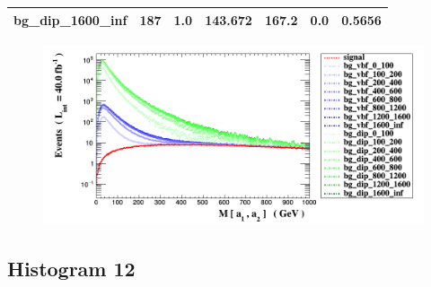 \documentclass[a4paper, 10pt]{article}
\begin{document}
\begin{table}[H]
\begin{center}
\begin{tabular}{|m{23.0mm}|m{23.0mm}|m{18.0mm}|m{19.0mm}|m{19.0mm}|m{19.0mm}|m{19.0mm}|}
      \hline
      {\cellcolor{white}         bg\_dip\_1600\_inf}& {\cellcolor{white}         187}& {\cellcolor{white}         1.0}& {\cellcolor{white}         143.672}& {\cellcolor{white}         167.2}& {\cellcolor{green}         0.0}& {\cellcolor{green}         0.5656}\\
\hline
    \end{tabular}
  \end{center}
\end{table}

\begin{figure}[H]
  \begin{center}
    \includegraphics[scale=0.45]{selection_10.png}\\
\caption{   }
  \end{center}
\end{figure}
      \newpage
\subsection{ Histogram 12}
\end{document}

